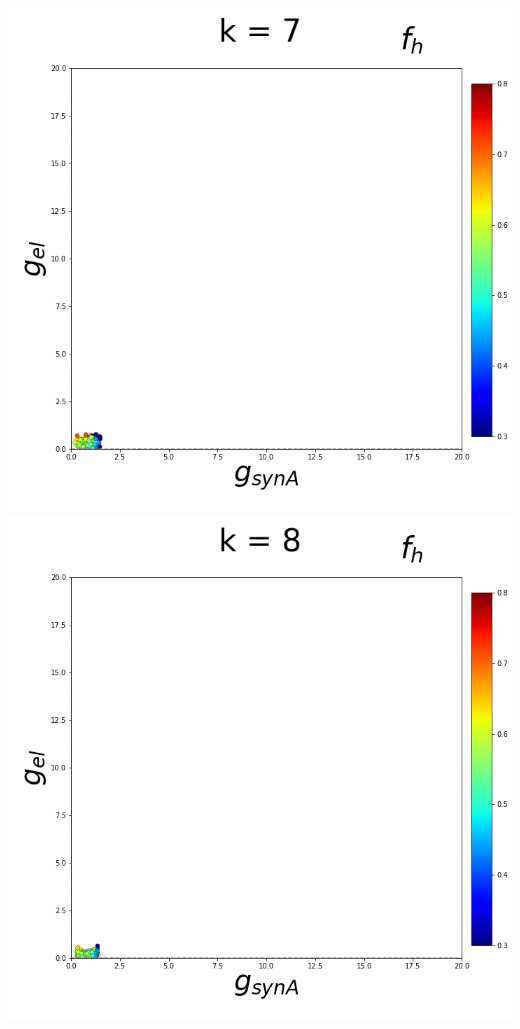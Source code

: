 \documentclass[11pt]{article}
\begin{document}
\begin{center}
{}%
\includegraphics[scale=0.125]{DSN_figs/STGCircuit_DSN_c=2_rs=1_k=7.png}
\includegraphics[scale=0.125]{DSN_figs/STGCircuit_DSN_c=2_rs=1_k=8.png}

\end{center}
\end{document}
